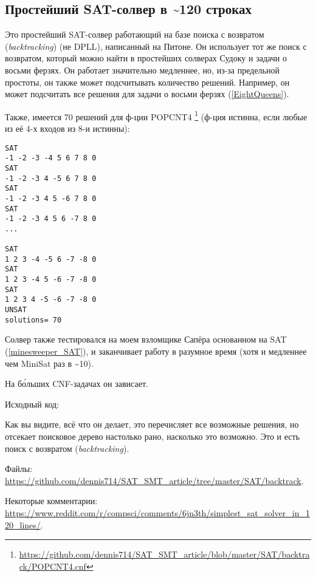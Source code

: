 \subsection{Простейший SAT-солвер в \textasciitilde{}120 строках}
\label{SAT_backtrack}

Это простейший SAT-солвер работающий на базе поиска с возвратом (\textit{backtracking}) (не \ac{DPLL}), написанный
на Питоне.
Он использует тот же поиск с возвратом, который можно найти в простейших солверах Судоку и задачи о восьми ферзях.
Он работает значительно медленнее, но, из-за предельной простоты, он также может подсчитывать количество решений.
Например, он может подсчитать все решения для задачи о восьми ферзях (\ref{EightQueens}).

Также, имеется 70 решений для ф-ции POPCNT4
\footnote{\url{https://github.com/dennis714/SAT_SMT_article/blob/master/SAT/backtrack/POPCNT4.cnf}}
(ф-ция истинна, если любые из её 4-х входов из 8-и истинны):

\begin{lstlisting}
SAT
-1 -2 -3 -4 5 6 7 8 0
SAT
-1 -2 -3 4 -5 6 7 8 0
SAT
-1 -2 -3 4 5 -6 7 8 0
SAT
-1 -2 -3 4 5 6 -7 8 0
...

SAT
1 2 3 -4 -5 6 -7 -8 0
SAT
1 2 3 -4 5 -6 -7 -8 0
SAT
1 2 3 4 -5 -6 -7 -8 0
UNSAT
solutions= 70
\end{lstlisting}

Солвер также тестировался на моем взломщике Сапёра основанном на SAT (\ref{minesweeper_SAT}),
и заканчивает работу в разумное время (хотя и медленнее чем MiniSat раз в \textasciitilde{}10).

На б\'{о}льших \ac{CNF}-задачах он зависает.

Исходный код:


Как вы видите, всё что он делает, это перечисляет все возможные решения, но отсекает поисковое дерево настолько рано,
насколько это возможно.
Это и есть поиск с возвратом (\textit{backtracking}).

Файлы: \url{https://github.com/dennis714/SAT_SMT_article/tree/master/SAT/backtrack}.

Некоторые комментарии: \url{https://www.reddit.com/r/compsci/comments/6jn3th/simplest_sat_solver_in_120_lines/}.

